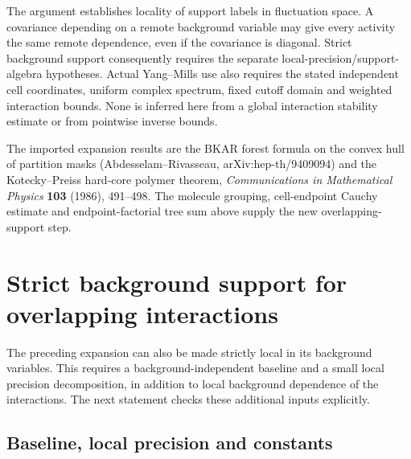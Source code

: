 \documentclass[11pt]{article}
\theoremstyle{remark}
\begin{document}
The argument establishes locality of support labels in fluctuation
space. A covariance depending on a remote background variable may
give every activity the same remote dependence, even if the
covariance is diagonal. Strict background support consequently
requires the separate local-precision/support-algebra hypotheses.
Actual Yang--Mills use also requires the stated independent cell
coordinates, uniform complex spectrum, fixed cutoff domain and
weighted interaction bounds. None is inferred here from a global
interaction stability estimate or from pointwise inverse bounds.

The imported expansion results are the BKAR forest formula on the
convex hull of partition masks (Abdesselam--Rivasseau,
arXiv:hep-th/9409094) and the Kotecky--Preiss hard-core polymer
theorem, \emph{Communications in Mathematical Physics} \textbf{103}
(1986), 491--498. The molecule grouping, cell-endpoint Cauchy
estimate and endpoint-factorial tree sum above supply the new
overlapping-support step.


\section{Strict background support for overlapping interactions}
\label{ob-section}

The preceding expansion can also be made strictly local in its
background variables. This requires a background-independent baseline
and a small local precision decomposition, in addition to local
background dependence of the interactions. The next statement checks
these additional inputs explicitly.

\subsection{Baseline, local precision and constants}
\end{document}
